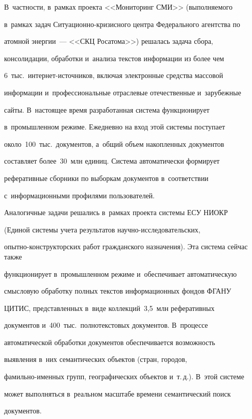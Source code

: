 В~частности, в~рамках проекта <<Мониторинг СМИ>> (выполняемого 


в~рамках задач Си\-туа\-ци\-он\-но-кри\-зис\-но\-го центра Федерального агентства по 


атомной энергии~--- <<СКЦ Росатома>>) решалась задача сбора, 


консолидации, обработки и~анализа текстов информации из более чем 


6~тыс.\ интернет-источников, включая электронные средства массовой 


информации и~профессиональные отраслевые отечественные и~зарубежные 


сайты. В~настоящее время разработанная система функционирует 


в~промышленном режиме. Ежедневно на вход этой системы поступает 


около~100~тыс.\ документов, а~общий объем накопленных документов 


составляет более~30~млн единиц. Система автоматически формирует 


реферативные сборники по выборкам документов в~соответствии 


с~информационными профилями пользователей.


     


     Аналогичные задачи решались в~рамках проекта системы ЕСУ НИОКР 


(Единой системы учета результатов научно-исследовательских, 


опытно-кон\-ст\-рук\-тор\-ских работ гражданского назначения). Эта система сейчас также 


функционирует в~промышленном режиме и~обеспечивает автоматическую 


смысловую обработку полных текстов информационных фондов ФГАНУ 


ЦИТИС, представленных в~виде коллекций~3,5~млн реферативных 


документов и~400~тыс.\ полнотекстовых документов. В~процессе 


автоматической обработки документов обеспечивается возможность 


выявления в~них семантических объектов (стран, городов,  


фа\-миль\-но-имен\-ных групп, географических объектов и~т.\,д.). В~этой системе 


может выполняться в~реальном масштабе времени семантический поиск 


документов.


